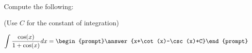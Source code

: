 \documentclass{ximera}
\author{Jim Talamo}
\begin{document}
\begin{exercise}
Compute the following:

\begin{prompt} (Use $C$ for the constant of integration) \end{prompt}

\[
\int \frac{\cos(x)}{1+\cos(x)} dx =
\begin{prompt}\answer{x+\cot(x)-\csc(x)+C}\end{prompt} \\
\]

\end{exercise}
\end{document}
